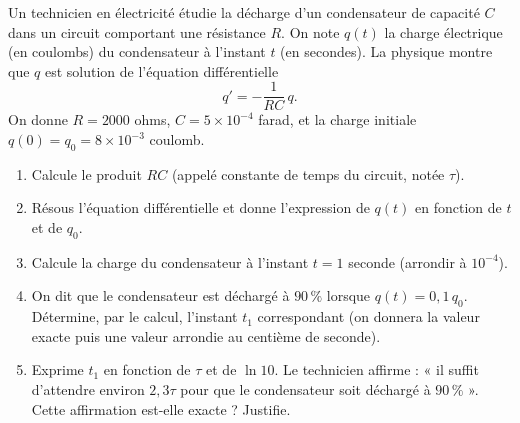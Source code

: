 \documentclass[11pt]{article}
\newcommand{\cle}[1]{{\popxbold\color{popdark}#1}}
\begin{document}
\begin{exercice}
Un technicien en électricité étudie la décharge d'un condensateur de capacité $C$ dans un circuit comportant une résistance $R$. On note $q(t)$ la charge électrique (en coulombs) du condensateur à l'instant $t$ (en secondes). La physique montre que $q$ est solution de l'équation différentielle
\[ q' = -\dfrac{1}{RC}\,q. \]
On donne $R = \num{2000}$ ohms, $C = 5 \times 10^{-4}$ farad, et la charge initiale $q(0) = q_0 = 8 \times 10^{-3}$ coulomb.
\begin{enumerate}
\item Calcule le produit $RC$ (appelé \cle{constante de temps} du circuit, notée $\tau$).
\item Résous l'équation différentielle et donne l'expression de $q(t)$ en fonction de $t$ et de $q_0$.
\item Calcule la charge du condensateur à l'instant $t = 1$ seconde (arrondir à $10^{-4}$).
\item On dit que le condensateur est déchargé à $90\,\%$ lorsque $q(t) = 0{,}1\,q_0$. Détermine, par le calcul, l'instant $t_1$ correspondant (on donnera la valeur exacte puis une valeur arrondie au centième de seconde).
\item Exprime $t_1$ en fonction de $\tau$ et de $\ln 10$. Le technicien affirme : « il suffit d'attendre environ $2{,}3\tau$ pour que le condensateur soit déchargé à $90\,\%$ ». Cette affirmation est-elle exacte ? Justifie.
\end{enumerate}
\end{exercice}
\end{document}
